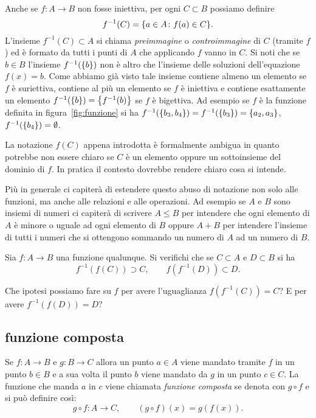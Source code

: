 Anche se $f\colon A \to B$ non fosse iniettiva,
per ogni $C\subset B$ possiamo definire
\[
  f^{-1}(C) = {\left\{ a\in A\colon f(a) \in C \right\}}.
\]
L'insieme $f^{-1}(C)\subset A$ si chiama \emph{preimmagine}
o \emph{controimmagine}
%
%
%
%
%
di $C$ (tramite $f$)
ed è formato da tutti i punti di $A$ che applicando $f$ vanno in $C$.
Si noti che se $b\in B$ l'insieme $f^{-1}({\left\{ b \right\}})$ non è altro che
l'insieme delle soluzioni dell'equazione $f(x)=b$. Come abbiamo
già visto tale insieme contiene almeno un elemento se $f$ è suriettiva,
contiene al più un elemento se $f$ è iniettiva e contiene esattamente
un elemento $f^{-1}({\left\{ b \right\}}) = {\left\{ f^{-1}(b) \right\}}$ se $f$ è bigettiva.
Ad esempio se $f$ è la funzione definita in figura~\ref{fig:funzione}
si ha $f^{-1}({\left\{ b_3,b_4 \right\}}) = f^{-1}({\left\{ b_3 \right\}}) = {\left\{ a_2,a_3 \right\}}$,
$f^{-1}({\left\{ b_4 \right\}}) = \emptyset$.


La notazione $f(C)$ appena introdotta è formalmente ambigua in quanto
potrebbe non essere chiaro se $C$ è un elemento oppure un sottoinsieme
del dominio di $f$.
In pratica il contesto dovrebbe rendere chiaro cosa si intende.

Più in generale ci capiterà di estendere questo abuso di notazione non solo
alle funzioni, ma anche alle relazioni e alle operazioni.
Ad esempio se $A$ e $B$ sono insiemi di numeri ci capiterà di scrivere $A\le B$
per intendere che ogni elemento di $A$ è minore o uguale ad ogni elemento di $B$
oppure $A+B$ per intendere l'insieme di tutti i numeri che si ottengono sommando
un numero di $A$ ad un numero di $B$.

\begin{exercise}
  Sia $f\colon A \to B$ una funzione qualunque. 
  Si verifichi che se $C\subset A$ e $D\subset B$ si ha 
  \[
    f^{-1}(f(C))\supset C,
    \qquad 
    f(f^{-1}(D)) \subset D. 
  \]
  
  Che ipotesi possiamo fare su $f$ per avere l'uguaglianza
  $f(f^{-1}(C)) = C$?
  E per avere $f^{-1}(f(D)) = D$?
\end{exercise}

\subsection{funzione composta}
%

Se $f\colon A\to B$ e $g\colon B\to C$ allora un punto $a\in A$ 
viene mandato tramite $f$ in un punto $b\in B$ e 
a sua volta il punto $b$ viene mandato da $g$ in un punto 
$c \in C$. 
La funzione che manda $a$ in $c$ viene chiamata 
\emph{funzione composta}%
%
 se denota con $g\circ f$ 
e si può definire così:
\[
g\circ f \colon A \to C, \qquad 
(g\circ f)(x) = g(f(x)).  
\]

